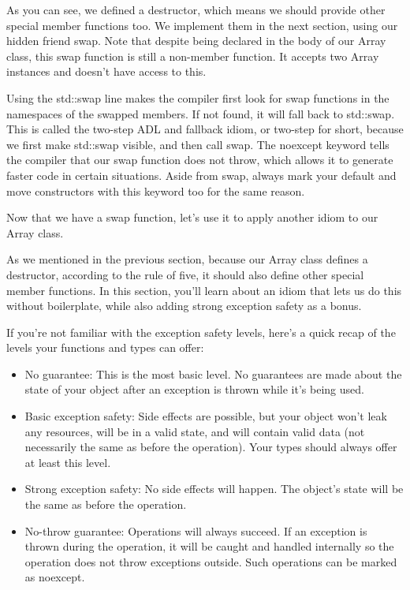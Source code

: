 As you can see, we defined a destructor, which means we should provide other special member functions too. We implement them in the next section, using our hidden friend swap. Note that despite being declared in the body of our Array class, this swap function is still a non-member function. It accepts two Array instances and doesn't have access to this.

Using the std::swap line makes the compiler first look for swap functions in the namespaces of the swapped members. If not found, it will fall back to std::swap. This is called the two-step ADL and fallback idiom, or two-step for short, because we first make std::swap visible, and then call swap. The noexcept keyword tells the compiler that our swap function does not throw, which allows it to generate faster code in certain situations. Aside from swap, always mark your default and move constructors with this keyword too for the same reason.

Now that we have a swap function, let's use it to apply another idiom to our Array class.


As we mentioned in the previous section, because our Array class defines a destructor, according to the rule of five, it should also define other special member functions. In this section, you'll learn about an idiom that lets us do this without boilerplate, while also adding strong exception safety as a bonus.

If you're not familiar with the exception safety levels, here's a quick recap of the levels your functions and types can offer:

\begin{itemize}
\item 
No guarantee: This is the most basic level. No guarantees are made about the state of your object after an exception is thrown while it's being used.

\item 
Basic exception safety: Side effects are possible, but your object won't leak any resources, will be in a valid state, and will contain valid data (not necessarily the same as before the operation). Your types should always offer at least this level.

\item 
Strong exception safety: No side effects will happen. The object's state will be the same as before the operation.

\item 
No-throw guarantee: Operations will always succeed. If an exception is thrown during the operation, it will be caught and handled internally so the operation does not throw exceptions outside. Such operations can be marked as noexcept.
\end{itemize}

